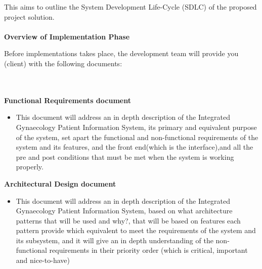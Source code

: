 This aims to outline the System Development Life-Cycle (SDLC) of the
proposed project solution.
\newline \\ \\
\large \textbf{Overview of Implementation Phase}
\newline

Before implementations takes place, the development team will provide you (client) with the following documents:

\newline \\ \\
\textbf{Functional Requirements document}
    \begin{itemize}
         \item This document will address an in depth description of the Integrated Gynaecology Patient Information System, its primary and equivalent purpose of the system, set apart the functional and non-functional requirements of the system and its features, and the front end(which is the interface),and all the pre and post conditions that must be met when the system is working properly.
    \end{itemize}

\newline
\textbf{Architectural Design document}

    \begin{itemize}
         \item This document will address an in depth description of the Integrated Gynaecology Patient Information System, based on what architecture patterns that will be used and why?, that will be based on features each pattern provide which equivalent to meet the requirements of the system and its subsystem, and it will give an in depth understanding of the non-functional requirements in their priority order (which is critical, important and nice-to-have) 
    \end{itemize}
    
\newline

